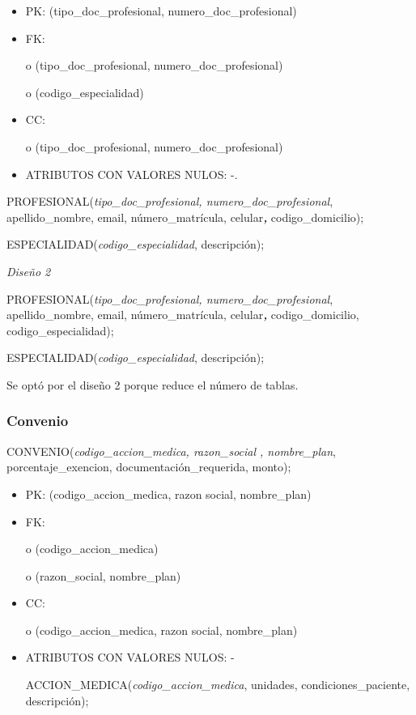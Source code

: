 \documentclass[a4paper,11pt]{article}
\begin{document}
\begin{itemize}
\item PK: (tipo\_doc\_profesional, numero\_doc\_profesional)

\item FK: 

o (tipo\_doc\_profesional, numero\_doc\_profesional)

o (codigo\_especialidad)

\item CC:

o (tipo\_doc\_profesional, numero\_doc\_profesional)

\item ATRIBUTOS CON VALORES NULOS:  -.
\end{itemize}

PROFESIONAL(\emph{tipo\_doc\_profesional, numero\_doc\_profesional}, apellido\_nombre, 
email, número\_matrícula, celular\textit{\textbf{, }}codigo\_domicilio);

ESPECIALIDAD(\emph{codigo\_especialidad}, descripción);

\textit{Diseño 2}

PROFESIONAL(\emph{tipo\_doc\_profesional, numero\_doc\_profesional}, apellido\_nombre, 
email, número\_matrícula, celular\textit{\textbf{, }}codigo\_domicilio,\textit{\textbf{ 
}}codigo\_especialidad);

ESPECIALIDAD(\emph{codigo\_especialidad}, descripción);

Se optó por el diseño 2 porque reduce el número de tablas.\label{HToc293405846}

\subsubsection{\textbf{Convenio}}

CONVENIO(\emph{codigo\_accion\_medica, razon\_social , nombre\_plan}, porcentaje\_exencion, 
documentación\_requerida, monto);

\begin{itemize}
\item PK: (codigo\_accion\_medica, razon social, nombre\_plan)

\item FK: 

o (codigo\_accion\_medica)

o (razon\_social,  nombre\_plan)

\item CC:

o (codigo\_accion\_medica, razon social, nombre\_plan)

\item ATRIBUTOS CON VALORES NULOS:  -

ACCION\_MEDICA(\emph{codigo\_accion\_medica}, unidades, condiciones\_paciente, 
descripción);
\end{itemize}
\end{document}
